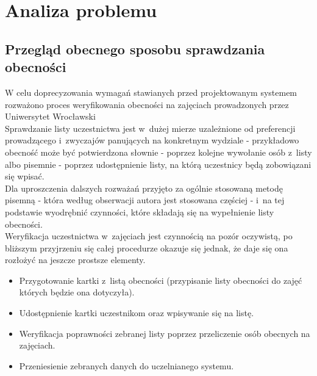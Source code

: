 \documentclass[declaration,shortabstract, mgr]{iithesis}
\begin{document}
\chapter{Analiza problemu}
\section{Przegląd obecnego sposobu sprawdzania obecności}
\indent W celu doprecyzowania wymagań stawianych przed projektowanym systemem rozważono proces weryfikowania obecności na zajęciach prowadzonych przez Uniwersytet Wrocławski\\
\indent Sprawdzanie listy uczestnictwa jest w~dużej mierze uzależnione od preferencji prowadzącego i~zwyczajów panujących na konkretnym wydziale - przykładowo obecność może być potwierdzona słownie - poprzez kolejne wywołanie osób z~listy albo pisemnie - poprzez udostępnienie listy, na którą uczestnicy będą zobowiązani się wpisać.\\
\indent Dla uproszczenia dalszych rozważań przyjęto za ogólnie stosowaną metodę pisemną - która według obserwacji autora jest stosowana częściej - i~na tej podstawie wyodrębnić czynności, które składają się na wypełnienie listy obecności.\\
\indent Weryfikacja uczestnictwa w~zajęciach jest czynnością na pozór oczywistą, po bliższym przyjrzeniu się całej procedurze okazuje się jednak, że daje się ona rozłożyć na jeszcze prostsze elementy. \\

\begin{itemize}
\item Przygotowanie kartki z~listą obecności (przypisanie listy obecności do zajęć których będzie ona dotyczyła).
\item Udostępnienie kartki uczestnikom oraz wpisywanie się na listę.
\item Weryfikacja poprawności zebranej listy poprzez przeliczenie osób obecnych na zajęciach.
\item Przeniesienie zebranych danych do uczelnianego systemu.
\end{itemize}
\end{document}
